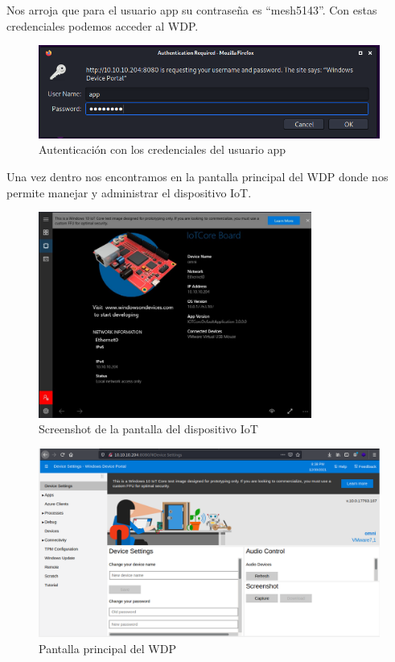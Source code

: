 \documentclass{article}
\begin{document}
Nos arroja que para el usuario app su contraseña es “mesh5143”. Con estas credenciales podemos acceder al WDP.
\begin{figure}[H]
	\center
	\includegraphics[width=\textwidth]{images/omni/17.png}
	\caption{Autenticación con los credenciales del usuario app}
\end{figure}

Una vez dentro nos encontramos en la pantalla principal del WDP donde nos permite manejar y administrar el dispositivo IoT.
\begin{figure}[H]
	\center
	\includegraphics[width=0.8\textwidth]{images/omni/18.png}
	\caption{Screenshot de la pantalla del dispositivo IoT}
\end{figure}
\begin{figure}[H]
	\center
	\includegraphics[width=\textwidth]{images/omni/19.png}
	\caption{Pantalla principal del WDP}
\end{figure}
\end{document}

